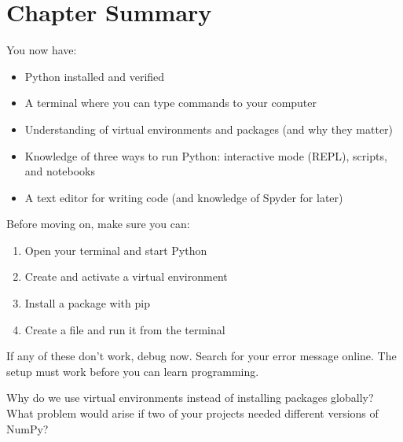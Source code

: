 \section{Chapter Summary}
\label{sec:setup-summary}

You now have:

\begin{itemize}
    \item Python installed and verified
    \item A terminal where you can type commands to your computer
    \item Understanding of virtual environments and packages (and why they matter)
    \item Knowledge of three ways to run Python: interactive mode (REPL), scripts, and notebooks
    \item A text editor for writing code (and knowledge of Spyder for later)
\end{itemize}

Before moving on, make sure you can:

\begin{enumerate}
    \item Open your terminal and start Python
    \item Create and activate a virtual environment
    \item Install a package with pip
    \item Create a  file and run it from the terminal
\end{enumerate}

If any of these don't work, debug now. Search for your error message online. The setup must work before you can learn programming.

\begin{ponder}
Why do we use virtual environments instead of installing packages globally? What problem would arise if two of your projects needed different versions of NumPy?
\end{ponder}
